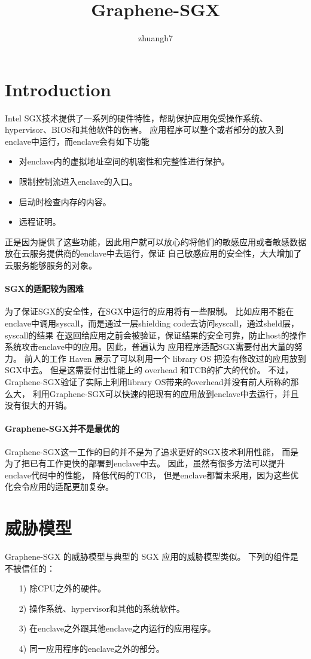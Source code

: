 \documentclass{article}
\author{zhuangh7}
\title{Graphene-SGX}
\begin{document}
\maketitle
\section{Introduction}
Intel SGX技术提供了一系列的硬件特性，帮助保护应用免受操作系统、hypervisor、BIOS和其他软件的伤害。
应用程序可以整个或者部分的放入到enclave中运行，而enclave会有如下功能
\begin{itemize}
    \item 对enclave内的虚拟地址空间的机密性和完整性进行保护。
    \item 限制控制流进入enclave的入口。
    \item 启动时检查内存的内容。
    \item 远程证明。
\end{itemize}

正是因为提供了这些功能，因此用户就可以放心的将他们的敏感应用或者敏感数据放在云服务提供商的enclave中去运行，保证
自己敏感应用的安全性，大大增加了云服务能够服务的对象。
\paragraph{SGX的适配较为困难}为了保证SGX的安全性，在SGX中运行的应用将有一些限制。
比如应用不能在enclave中调用syscall，而是通过一层shielding code去访问syscall，通过sheld层，syscall的结果
在返回给应用之前会被验证，保证结果的安全可靠，防止host的操作系统攻击enclave中的应用。因此，普遍认为
应用程序适配SGX需要付出大量的努力。
前人的工作 Haven \cite{186173}展示了可以利用一个 library OS 把没有修改过的应用放到SGX中去。
但是这需要付出性能上的 overhead 和TCB的扩大的代价。
不过，Graphene-SGX验证了实际上利用library OS带来的overhead并没有前人所称的那么大，
利用Graphene-SGX可以快速的把现有的应用放到enclave中去运行，并且没有很大的开销。

\paragraph{Graphene-SGX并不是最优的}
Graphene-SGX这一工作的目的并不是为了追求更好的SGX技术利用性能，
而是为了把已有工作更快的部署到enclave中去。
因此，虽然有很多方法可以提升enclave代码中的性能，
降低代码的TCB，
但是enclave都暂未采用，因为这些优化会令应用的适配更加复杂。



\section{威胁模型}
Graphene-SGX 的威胁模型与典型的 SGX 应用的威胁模型类似。
下列的组件是不被信任的：
\begin{itemize}
    \item [1)] 
    除CPU之外的硬件。
    \item [2)]
    操作系统、hypervisor和其他的系统软件。
    \item [3)]
    在enclave之外跟其他enclave之内运行的应用程序。
    \item [4)]
    同一应用程序的enclave之外的部分。
\end{itemize}   
\end{document}
